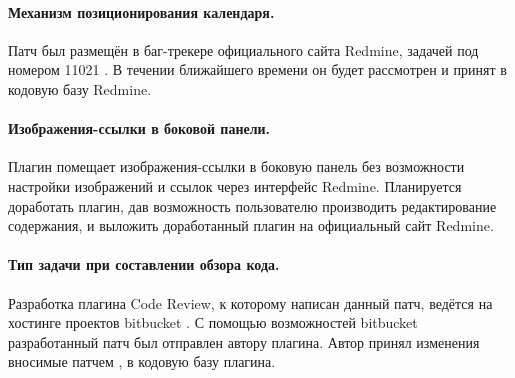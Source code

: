 \paragraph{Механизм позиционирования календаря.}
Патч был размещён в баг-трекере официального сайта Redmine, задачей под номером
11021 \cite{calendar-bug}. В течении ближайшего времени он будет рассмотрен и
принят в кодовую базу Redmine.

\paragraph{Изображения-ссылки в боковой панели.}
Плагин помещает изображения-ссылки в боковую панель без возможности настройки
изображений и ссылок через интерфейс Redmine. Планируется доработать плагин,
дав возможность пользователю производить редактирование содержания, и выложить
доработанный плагин на официальный сайт Redmine.

\paragraph{Тип задачи при составлении обзора кода.}
Разработка плагина Code Review, к которому написан данный патч, ведётся на
хостинге проектов bitbucket \cite{bitbucket}. С помощью возможностей bitbucket
разработанный патч был отправлен автору плагина. Автор принял изменения
вносимые патчем \cite{pull-request}, в кодовую базу плагина.


